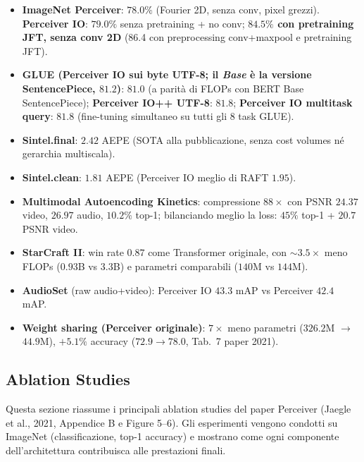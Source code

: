 \documentclass[
  11pt,
]{article}
\begin{document}
\begin{formulabox}[title={\textbf{Numeri chiave da memorizzare}}]
\begin{itemize}
  \item \textbf{ImageNet Perceiver}: $78.0\%$ (Fourier 2D, senza conv, pixel grezzi). \textbf{Perceiver IO}: $79.0\%$ senza pretraining + no conv; \textbf{$84.5\%$ con pretraining JFT, senza conv 2D} (86.4 con preprocessing conv+maxpool e pretraining JFT).
  \item \textbf{GLUE (Perceiver IO sui byte UTF-8; il \emph{Base} è la versione SentencePiece, $81.2$)}: $81.0$ (a parità di FLOPs con BERT Base SentencePiece); \textbf{Perceiver IO++ UTF-8}: $81.8$; \textbf{Perceiver IO multitask query}: $81.8$ (fine-tuning simultaneo su tutti gli 8 task GLUE).
  \item \textbf{Sintel.final}: $2.42$ AEPE (SOTA alla pubblicazione, senza cost volumes né gerarchia multiscala).
  \item \textbf{Sintel.clean}: $1.81$ AEPE (Perceiver IO meglio di RAFT $1.95$).
  \item \textbf{Multimodal Autoencoding Kinetics}: compressione $88\times$ con PSNR $24.37$ video, $26.97$ audio, $10.2\%$ top-1; bilanciando meglio la loss: $45\%$ top-1 + $20.7$ PSNR video.
  \item \textbf{StarCraft II}: win rate $0.87$ come Transformer originale, con $\sim 3.5\times$ meno FLOPs ($0.93$B vs $3.3$B) e parametri comparabili ($140$M vs $144$M).
  \item \textbf{AudioSet} (raw audio+video): Perceiver IO $43.3$ mAP vs Perceiver $42.4$ mAP.
  \item \textbf{Weight sharing (Perceiver originale)}: $7\times$ meno parametri ($326.2$M $\to$ $44.9$M), $+5.1\%$ accuracy ($72.9 \to 78.0$, Tab.\ 7 paper 2021).
\end{itemize}
\end{formulabox}

\subsection{Ablation Studies}
\label{sec:ablations}

Questa sezione riassume i principali ablation studies del paper Perceiver (Jaegle et al., 2021, Appendice B e Figure 5--6). Gli esperimenti vengono condotti su ImageNet (classificazione, top-1 accuracy) e mostrano come ogni componente dell'architettura contribuisca alle prestazioni finali.
\end{document}
